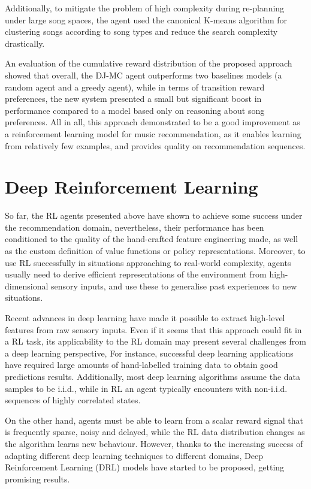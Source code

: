 Additionally, to mitigate the problem of high complexity during re-planning under large song spaces, the agent used the canonical K-means algorithm for clustering songs according to song types and reduce the search complexity drastically.

An evaluation of the cumulative reward distribution of the proposed approach showed that overall, the DJ-MC agent outperforms two baselines models (a random agent and a greedy agent), while in terms of transition reward preferences, the new system presented a small but significant boost in performance compared to a model based only on reasoning about song preferences. All in all, this approach demonstrated to be a good improvement as a reinforcement learning model for music recommendation, as it enables learning from relatively few examples, and provides quality on recommendation sequences.

\section{Deep Reinforcement Learning}

So far, the RL agents presented above have shown to achieve some success under the recommendation domain, nevertheless, their performance has been conditioned to the quality of the hand-crafted feature engineering made, as well as the custom definition of value functions or policy representations. Moreover, to use RL successfully in situations approaching to real-world complexity, agents usually need to derive efficient representations of the environment from high-dimensional sensory inputs, and use these to generalise past experiences to new situations.

Recent advances in deep learning have made it possible to extract high-level features from raw sensory inputs\cite{bengio2013representation}. Even if it seems that this approach could fit in a RL task, its applicability to the RL domain may present several challenges from a deep learning perspective, For instance, successful deep learning applications have required large amounts of hand-labelled training data to obtain good predictions results. Additionally, most deep learning algorithms assume the data samples to be i.i.d., while in RL an agent typically encounters with non-i.i.d. sequences of highly correlated states.

On the other hand, agents must be able to learn from a scalar reward signal that is frequently sparse, noisy and delayed, while the RL data distribution changes as the algorithm learns new behaviour. However, thanks to the increasing success of adapting different deep learning techniques to different domains, Deep Reinforcement Learning (DRL) models have started to be proposed, getting promising results.

